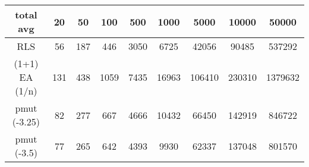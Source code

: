 \begin{tabular}[h]{ccccccccc}
total avg&20&50&100&500&1000&5000&10000&50000\\\hline
RLS&56&187&446&3050&6725&42056&90485&537292\\
(1+1) EA (1/n)&131&438&1059&7435&16963&106410&230310&1379632\\
pmut (-3.25)&82&277&667&4666&10432&66450&142919&846722\\
pmut (-3.5)&77&265&642&4393&9930&62337&137048&801570\\
\end{tabular}

